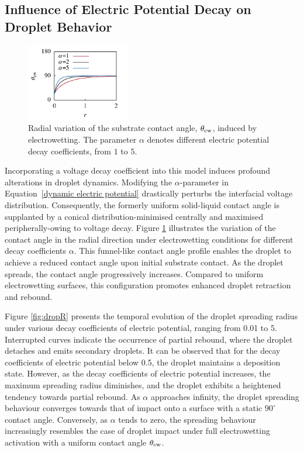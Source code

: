 \documentclass[lineno]{cls/jfm}
\begin{document}
\subsection{Influence of Electric Potential Decay on Droplet Behavior}

 \begin{figure}
  \centerline{\includegraphics[width=0.4\textwidth]{fig/decay.pdf}}
  \caption{Radial variation of the substrate contact angle, $\theta_{\rm ew}$, induced by electrowetting. The parameter $\alpha$ denotes different electric potential decay coefficients, from $1$ to $5$.}
 \label{fig:decay}
 \end{figure}

 Incorporating a voltage decay coefficient into this model induces profound alterations in droplet dynamics. Modifying the $\alpha$-parameter in Equation~\ref{dynamic electric potential} drastically perturbs the interfacial voltage distribution. Consequently, the formerly uniform solid-liquid contact angle is supplanted by a conical distribution-minimised centrally and maximised peripherally-owing to voltage decay. Figure \ref{fig:decay} illustrates the variation of the contact angle in the radial direction under electrowetting conditions for different decay coefficients $\alpha$. This funnel-like contact angle profile enables the droplet to achieve a reduced contact angle upon initial substrate contact. As the droplet spreads, the contact angle progressively increases. Compared to uniform electrowetting surfaces, this configuration promotes enhanced droplet retraction and rebound.

 Figure \ref{fig:dropR} presents the temporal evolution of the droplet spreading radius under various decay coefficients of electric potential, ranging from 0.01 to 5. Interrupted curves indicate the occurrence of partial rebound, where the droplet detaches and emits secondary droplets. It can be observed that for the decay coefficients of electric potential below 0.5, the droplet maintains a deposition state. However, as the decay coefficients of electric potential increases, the maximum spreading radius diminishes, and the droplet exhibits a heightened tendency towards partial rebound. As $\alpha$ approaches infinity, the droplet spreading behaviour converges towards that of impact onto a surface with a static $90^\circ$ contact angle. Conversely, as $\alpha$ tends to zero, the spreading behaviour increasingly resembles the case of droplet impact under full electrowetting activation with a uniform contact angle $\theta_{\rm ew}$.
\end{document}
